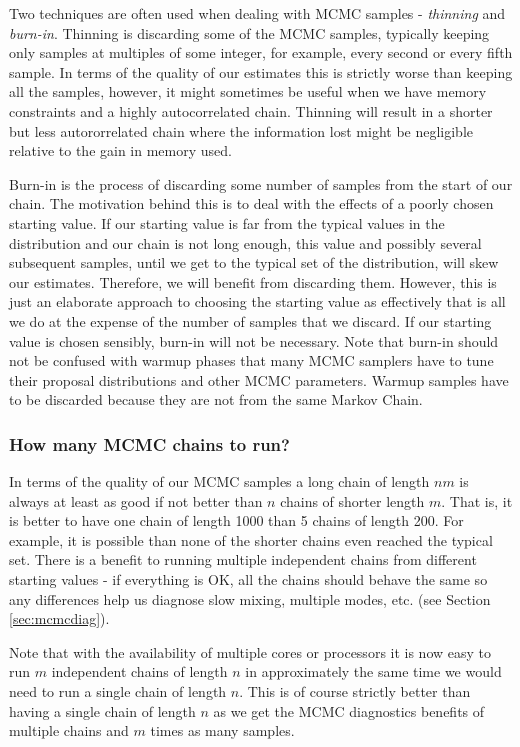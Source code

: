 \documentclass{book}
\theoremstyle{plain}%
\theoremstyle{definition}
\begin{document}
Two techniques are often used when dealing with MCMC samples - \emph{thinning} and \emph{burn-in}. Thinning is discarding some of the MCMC samples, typically keeping only samples at multiples of some integer, for example, every second or every fifth sample. In terms of the quality of our estimates this is strictly worse than keeping all the samples, however, it might sometimes be useful when we have memory constraints and a highly autocorrelated chain. Thinning will result in a shorter but less autororrelated chain where the information lost might be negligible relative to the gain in memory used.

Burn-in is the process of discarding some number of samples from the start of our chain. The motivation behind this is to deal with the effects of a poorly chosen starting value. If our starting value is far from the typical values in the distribution and our chain is not long enough, this value and possibly several subsequent samples, until we get to the typical set of the distribution, will skew our estimates. Therefore, we will benefit from discarding them. However, this is just an elaborate approach to choosing the starting value as effectively that is all we do at the expense of the number of samples that we discard. If our starting value is chosen sensibly, burn-in will not be necessary.  Note that burn-in should not be confused with warmup phases that many MCMC samplers have to tune their proposal distributions and other MCMC parameters. Warmup samples have to be discarded because they are not from the same Markov Chain.

\subsubsection*{How many MCMC chains to run?}\label{sec:mcmchowmanychains}

In terms of the quality of our MCMC samples a long chain of length $nm$ is always at least as good if not better than $n$ chains of shorter length $m$. That is, it is better to have one chain of length 1000 than 5 chains of length 200. For example, it is possible than none of the shorter chains even reached the typical set. There is a benefit to running multiple independent chains from different starting values - if everything is OK, all the chains should behave the same so any differences help us diagnose slow mixing, multiple modes, etc. (see Section \ref{sec:mcmcdiag}).

Note that with the availability of multiple cores or processors it is now easy to run $m$ independent chains of length $n$ in approximately the same time we would need to run a single chain of length $n$. This is of course strictly better than having a single chain of length $n$ as we get the MCMC diagnostics benefits of multiple chains and $m$ times as many samples.
\end{document}
